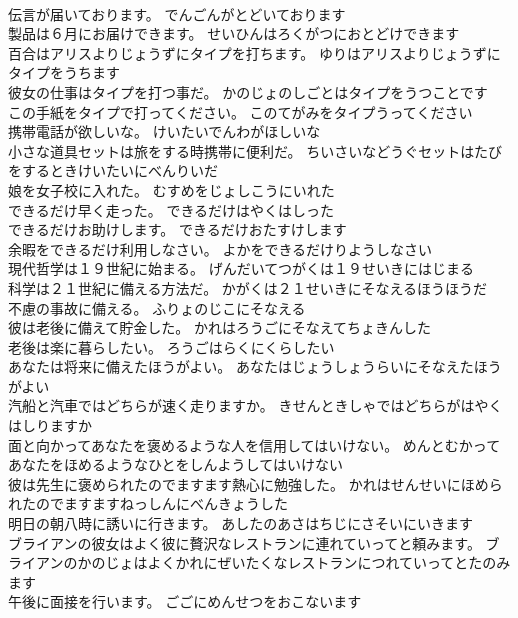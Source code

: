 \documentclass[8pt]{extreport}
\begin{document}
\begin{CJK}{UTF8}{min}
\\	伝言が届いております。	でんごんがとどいております 
\\	製品は６月にお届けできます。	せいひんはろくがつにおとどけできます 
\\	百合はアリスよりじょうずにタイプを打ちます。	ゆりはアリスよりじょうずにタイプをうちます 
\\	彼女の仕事はタイプを打つ事だ。	かのじょのしごとはタイプをうつことです 
\\	この手紙をタイプで打ってください。	このてがみをタイプうってください 
\\	携帯電話が欲しいな。	けいたいでんわがほしいな 
\\	小さな道具セットは旅をする時携帯に便利だ。	ちいさいなどうぐセットはたびをするときけいたいにべんりいだ 
\\	娘を女子校に入れた。	むすめをじょしこうにいれた 
\\	できるだけ早く走った。	できるだけはやくはしった 
\\	できるだけお助けします。	できるだけおたすけします 
\\	余暇をできるだけ利用しなさい。	よかをできるだけりようしなさい 
\\	現代哲学は１９世紀に始まる。	げんだいてつがくは１９せいきにはじまる 
\\	科学は２１世紀に備える方法だ。	かがくは２１せいきにそなえるほうほうだ 
\\	不慮の事故に備える。	ふりょのじこにそなえる 
\\	彼は老後に備えて貯金した。	かれはろうごにそなえてちょきんした 
\\	老後は楽に暮らしたい。	ろうごはらくにくらしたい 
\\	あなたは将来に備えたほうがよい。	あなたはじょうしょうらいにそなえたほうがよい 
\\	汽船と汽車ではどちらが速く走りますか。	きせんときしゃではどちらがはやくはしりますか 
\\	面と向かってあなたを褒めるような人を信用してはいけない。	めんとむかってあなたをほめるようなひとをしんようしてはいけない 
\\	彼は先生に褒められたのでますます熱心に勉強した。	かれはせんせいにほめられたのでますますねっしんにべんきょうした 
\\	明日の朝八時に誘いに行きます。	あしたのあさはちじにさそいにいきます 
\\	ブライアンの彼女はよく彼に贅沢なレストランに連れていってと頼みます。	ブライアンのかのじょはよくかれにぜいたくなレストランにつれていってとたのみます 
\\	午後に面接を行います。	ごごにめんせつをおこないます 

\end{CJK}
\end{document}
